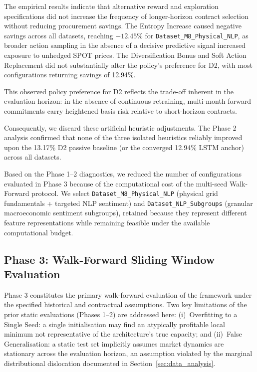The empirical results indicate that alternative reward and exploration specifications did not increase the frequency of longer-horizon contract selection without reducing procurement savings. The Entropy Increase caused negative savings across all datasets, reaching $-12.45\%$ for \texttt{Dataset\_\allowbreak M8\_\allowbreak Physical\_\allowbreak NLP}, as broader action sampling in the absence of a decisive predictive signal increased exposure to unhedged SPOT prices. The Diversification Bonus and Soft Action Replacement did not substantially alter the policy's preference for D2, with most configurations returning savings of 12.94\%.

This observed policy preference for D2 reflects the trade-off inherent in the evaluation horizon: in the absence of continuous retraining, multi-month forward commitments carry heightened basis risk relative to short-horizon contracts.

Consequently, we discard these artificial heuristic adjustments. The Phase 2 analysis confirmed that none of the three isolated heuristics reliably improved upon the 13.17\% D2 passive baseline (or the converged 12.94\% LSTM anchor) across all datasets.

Based on the Phase 1--2 diagnostics, we reduced the number of configurations evaluated in Phase 3 because of the computational cost of the multi-seed Walk-Forward protocol. We select \texttt{Dataset\_\allowbreak M8\_\allowbreak Physical\_\allowbreak NLP} (physical grid fundamentals + targeted NLP sentiment) and \texttt{Dataset\_\allowbreak NLP\_\allowbreak Subgroups} (granular macroeconomic sentiment subgroups), retained because they represent different feature representations while remaining feasible under the available computational budget.

\subsection{Phase 3: Walk-Forward Sliding Window Evaluation}
\label{subsec:res_phase3}

Phase 3 constitutes the primary walk-forward evaluation of the framework under the specified historical and contractual assumptions. Two key limitations of the prior static evaluations (Phases 1--2) are addressed here: (i)~Overfitting to a Single Seed: a single initialisation may find an atypically profitable local minimum not representative of the architecture's true capacity; and (ii)~False Generalisation: a static test set implicitly assumes market dynamics are stationary across the evaluation horizon, an assumption violated by the marginal distributional dislocation documented in Section~\ref{sec:data_analysis}.

